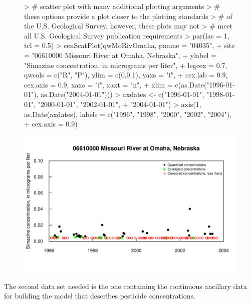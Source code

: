 \documentclass[11pt]{article}
\begin{document}
\begin{figure}[H]
\centering
\begin{Schunk}
\begin{Sinput}
> # scatter plot with many additional plotting arguments
> # these options provide a plot closer to the plotting standards
> # of the U.S. Geological Survey, however, these plots may not 
> # meet all U.S. Geological Survey publication requirements
> par(las = 1, tcl = 0.5)
> cenScatPlot(qwMoRivOmaha, pname = "04035",
+             site = "06610000 Missouri River at Omaha, Nebraska",
+             ylabel = "Simazine concentration, in micrograms per liter",
+             legcex = 0.7, qwcols = c("R", "P"), ylim = c(0,0.1), yaxs = "i", 
+             cex.lab = 0.9, cex.axis = 0.9, xaxs = "i", xaxt = "n",
+             xlim = c(as.Date("1996-01-01"), as.Date("2004-01-01")))
> axdates <- c("1996-01-01", "1998-01-01", "2000-01-01", "2002-01-01", 
+              "2004-01-01")
> axis(1, as.Date(axdates), labels = c("1996", "1998", "2000", "2002", "2004"), 
+      cex.axis = 0.9)
\end{Sinput}
\end{Schunk}
\includegraphics{vignette-003}
\end{figure}

The second data set needed is the one containing the continuous ancillary data for building the model that describes pesticide concentrations.  
\vspace{5 mm}
\end{document}
